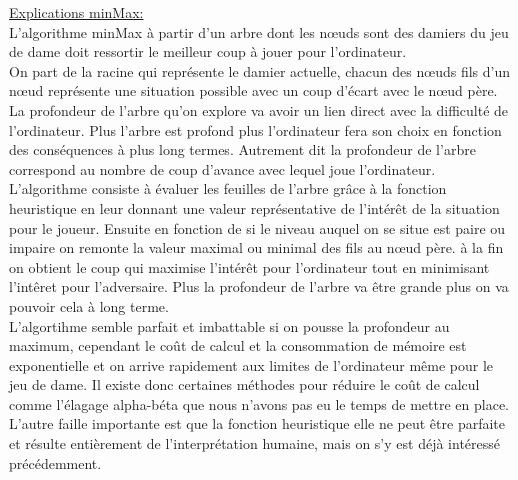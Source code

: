 \documentclass[12,french]{report}
\begin{document}
\pagebreak

\underline{Explications minMax:}\\

L'algorithme minMax à partir d'un arbre dont les nœuds sont des damiers du jeu de dame doit ressortir le meilleur coup à jouer pour l'ordinateur.\\
On part de la racine qui représente le damier actuelle, chacun des nœuds fils d'un nœud représente une situation possible avec un coup d'écart avec le nœud père. La profondeur de l'arbre qu'on explore va avoir un lien direct avec la difficulté de l'ordinateur. Plus l'arbre est profond plus l'ordinateur fera son choix en fonction des conséquences à plus long termes. Autrement dit la profondeur de l'arbre correspond au nombre de coup d'avance avec lequel joue l'ordinateur. \\
L'algorithme consiste à évaluer les feuilles de l'arbre grâce à la fonction heuristique en leur donnant une valeur représentative de l'intérêt de la situation pour le joueur. Ensuite en fonction de si le niveau auquel on se situe  est paire ou impaire on remonte la valeur maximal ou minimal des fils au nœud père. à la fin on obtient le coup qui maximise l'intérêt pour l'ordinateur tout en minimisant l'intêret pour l'adversaire. Plus la profondeur de l'arbre va être grande plus on va pouvoir cela à long terme.\\
L'algortihme semble parfait et imbattable si on pousse la profondeur au maximum, cependant le coût de calcul et la consommation de mémoire est exponentielle et on arrive rapidement aux limites de l'ordinateur même pour le jeu de dame. Il existe donc certaines méthodes pour réduire le coût de calcul comme l'élagage alpha-béta que nous n'avons pas eu le temps de mettre en place.
L'autre faille importante est que la fonction heuristique elle ne peut être parfaite et résulte entièrement de l'interprétation humaine, mais on s'y est déjà intéressé précédemment.
\end{document}
